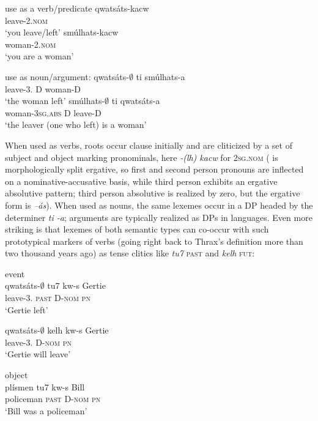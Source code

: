 \documentclass[output=paper]{langsci/langscibook}
\begin{document}
\ea %
 use as a verb/predicate
\ea
\gll qwatsáts-kacw\\
 leave-2{\sg}.\textsc{nom}\\
\glt ‘you leave/left’
\ex 
\gll smúlhats-kacw\\ 
 woman-2{\sg}.\textsc{nom}\\
\glt ‘you are a woman’
\z
\z

\ea%
use as noun/argument:
\ea
\gll qwatsáts-${\emptyset}$ ti smúlhats-a \\
 leave-3{\sg}.{\abs} D woman-D\\
\glt ‘the woman left’
\ex
\gll smúlhats-${\emptyset}$ ti qwatsáts-a \\
 woman-\textsc{3sg.abs} D leave-D\\
\glt ‘the leaver (one who left) is a woman’
\z
\z

  When used as verbs, roots occur clause initially and are cliticized by a set of subject and object marking pronominals, here \textit{-(lh) kacw} for \textsc{2sg.nom} ( is morphologically split ergative, so first and second person pronouns are inflected on a nominative-accusative basis, while third person exhibits an ergative absolutive pattern; third person absolutive is realized by zero, but the ergative form is \textit{–ás}). When used as nouns, the same lexemes occur in a DP headed by the determiner \textit{ti -a}; arguments are typically realized as DPs in  languages. Even more striking is that lexemes of both semantic types can co-occur with such prototypical markers of verbs (going right back to Thrax’s definition more than two thousand years ago) as tense clitics like \textit{tu7} \textsc{past} and \textit{kelh} \textsc{fut}:

\ea
event\\
\ea
 \gll qwatsáts-${\emptyset}$ tu7 kw-s Gertie\\
 leave-3{\sg.\abs} \textsc{past} D-\textsc{nom} \textsc{pn}\\
 \glt ‘Gertie left’

 \ex 
 \gll qwatsáts-${\emptyset}$ kelh kw-s Gertie\\
 leave-3{\sg.\abs} {\fut} D-\textsc{nom} \textsc{pn}\\
 \glt ‘Gertie will leave’
 \z
\z

\ea
 object\\
  \ea
 \gll plísmen tu7 kw-s Bill\\
 policeman \textsc{past} D-\textsc{nom} \textsc{pn}\\
 \glt ‘Bill was a policeman’
 
\end{document}
